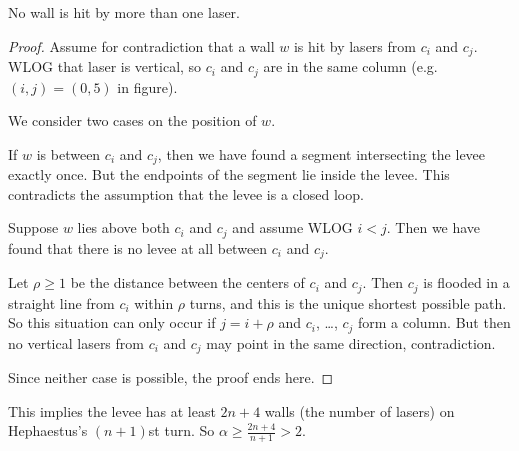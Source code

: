\documentclass[11pt]{scrartcl}
\begin{document}
\begin{claim*}
  No wall is hit by more than one laser.
\end{claim*}
\begin{proof}
  Assume for contradiction that a wall $w$ is hit
  by lasers from $c_i$ and $c_j$.
  WLOG that laser is vertical, so
  $c_i$ and $c_j$ are in the same column
  (e.g.\ $(i,j) = (0,5)$ in figure).

  We consider two cases on the position of $w$.
  \begin{itemize}
    \ii If $w$ is between $c_i$ and $c_j$,
    then we have found a segment intersecting
    the levee exactly once.
    But the endpoints of the segment lie inside the levee.
    This contradicts the assumption that the levee is a closed loop.

    \ii Suppose $w$ lies above both $c_i$ and $c_j$
    and assume WLOG $i < j$.
    Then we have found that there is no levee at all
    between $c_i$ and $c_j$.

    Let $\rho \ge 1$ be the distance between
    the centers of $c_i$ and $c_j$.
    Then $c_j$ is flooded in a straight line from $c_i$
    within $\rho$ turns, and this is the unique
    shortest possible path.
    So this situation can only occur if $j = i+\rho$
    and $c_i$, \dots, $c_j$ form a column.
    But then no vertical lasers from $c_i$ and $c_j$
    may point in the same direction, contradiction.
  \end{itemize}
  Since neither case is possible, the proof ends here.
\end{proof}

This implies the levee has at least $2n+4$ walls
(the number of lasers) on Hephaestus's $(n+1)$st turn.
So $\alpha \ge \frac{2n+4}{n+1} > 2$.
\end{document}
